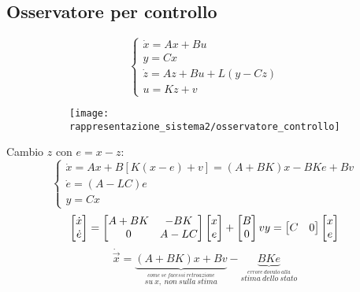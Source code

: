 \documentclass[../main.tex]{subfiles}
\begin{document}
	\subsection{Osservatore per controllo}
		\begin{figure}[H]
			\begin{subfigure}{0.5\textwidth}
				\[
					\begin{cases}
						\dot x = Ax + Bu\\
						y = Cx\\
						\dot z = Az + Bu + L(y-Cz)\\
						u = Kz + v
					\end{cases}
				\]
			\end{subfigure}
			\begin{subfigure}{0.5\textwidth}
				\centering\texttt{[image: rappresentazione\_sistema2/osservatore\_controllo]}
			\end{subfigure}
		\end{figure}
		
		Cambio $ z $ con $ e = x-z $:
		\[
			\begin{cases}
				\dot x = Ax + B\left[ K(x-e)+v \right] = (A+BK) x - BKe + Bv\\
				\dot e = (A-LC) e\\
				y = Cx
			\end{cases}
		\]
		\[
			\begin{bmatrix}
				\dot x\\
				\dot e
			\end{bmatrix} = 
			\begin{bmatrix}
				A+BK & -BK\\
				0 & A-LC
			\end{bmatrix}
			\begin{bmatrix}
				x\\
				e
			\end{bmatrix} +
			\begin{bmatrix}
				B\\
				0
			\end{bmatrix} v
			\\
			y =
			\begin{bmatrix}
				C & 0
			\end{bmatrix}
			\begin{bmatrix}
				x\\
				e
			\end{bmatrix}
		\]
		\[
			\dot{\vec x} = \underbrace{(A+BK)x + Bv}_{\stackrel{come\ se\ facessi\ retroazione}{su\ x,\ non\ sulla\ stima}} - \underbrace{BKe}_{\stackrel{errore\ dovuto\ alla}{stima\ dello\ stato}}
		\]
		
\end{document}
